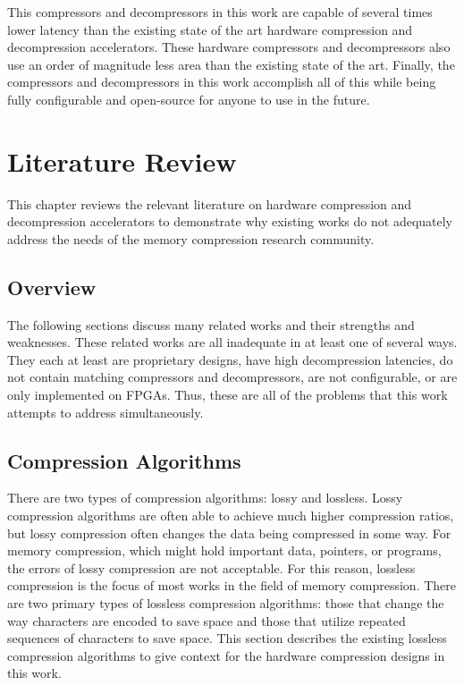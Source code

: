 \documentclass[doublespace,nopageskip]{VTthesis}
\begin{document}
This compressors and decompressors in this work are capable of several times lower latency than the existing state of the art hardware compression and decompression accelerators. These hardware compressors and decompressors also use an order of magnitude less area than the existing state of the art. Finally, the compressors and decompressors in this work accomplish all of this while being fully configurable and open-source for anyone to use in the future. 

\chapter{Literature Review} \label{ch:literature_review}
This chapter reviews the relevant literature on hardware compression and decompression accelerators to demonstrate why existing works do not adequately address the needs of the memory compression research community.

\section{Overview}\label{se:lit_rev_overview}
The following sections discuss many related works and their strengths and weaknesses. These related works are all inadequate in at least one of several ways. They each at least are proprietary designs, have high decompression latencies, do not contain matching compressors and decompressors, are not configurable, or are only implemented on FPGAs. Thus, these are all of the problems that this work attempts to address simultaneously.

\section{Compression Algorithms}\label{se:compression_algorithms}
There are two types of compression algorithms: lossy and lossless. Lossy compression algorithms are often able to achieve much higher compression ratios, but lossy compression often changes the data being compressed in some way. For memory compression, which might hold important data, pointers, or programs, the errors of lossy compression are not acceptable. For this reason, lossless compression is the focus of most works in the field of memory compression.
There are two primary types of lossless compression algorithms: those that change the way characters are encoded to save space and those that utilize repeated sequences of characters to save space. This section describes the existing lossless compression algorithms to give context for the hardware compression designs in this work.
\end{document}
